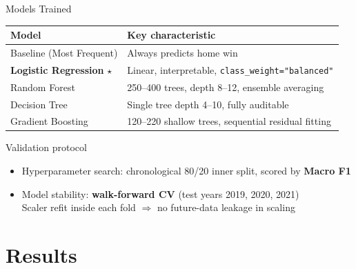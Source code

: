 \documentclass[10pt,aspectratio=169]{beamer}
\begin{document}
\begin{frame}{Models Trained}
  \begin{center}
    \begin{tabular}{ll}
      \toprule
      \textbf{Model} & \textbf{Key characteristic} \\
      \midrule
      Baseline (Most Frequent) & Always predicts home win \\
      \rowcolor{LightBlue}
      \textbf{Logistic Regression} $\star$ & Linear, interpretable, \texttt{class\_weight="balanced"} \\
      Random Forest & 250--400 trees, depth 8--12, ensemble averaging \\
      \rowcolor{LightBlue}
      Decision Tree & Single tree depth 4--10, fully auditable \\
      Gradient Boosting & 120--220 shallow trees, sequential residual fitting \\
      \bottomrule
    \end{tabular}
  \end{center}

  \medskip
  \begin{block}{Validation protocol}
    \begin{itemize}
      \item Hyperparameter search: chronological 80/20 inner split, scored by \textbf{Macro F1}
      \item Model stability: \textbf{walk-forward CV} (test years 2019, 2020, 2021) \\
            Scaler refit inside each fold $\Rightarrow$ no future-data leakage in scaling
    \end{itemize}
  \end{block}
\end{frame}

\section{Results}
\end{document}
